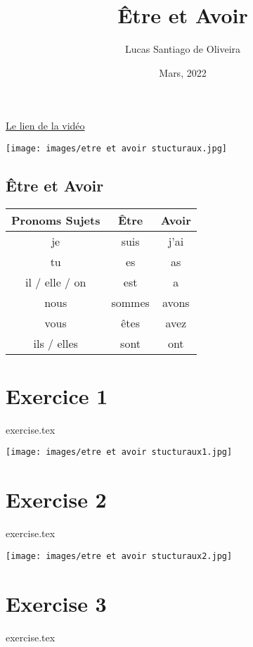\documentclass{article}
\title{Être et Avoir}
\author{Lucas Santiago de Oliveira}
\date{Mars, 2022}
\begin{document}
    \maketitle

    \vspace{2cm}

    \href{https://www.youtube.com/watch?v=Z2hZIJFg9v4}{Le lien de la vidéo}
    
    \texttt{[image: images/etre et avoir stucturaux.jpg]}
    \newpage

    \begin{center}
        \section*{Être et Avoir}
        \begin{tabular}{|c|c|c|}
            \hline
            Pronoms Sujets & Être & Avoir \\
            \hline
            je & suis & j'ai \\
            \hline
            tu & es & as \\ 
            \hline
            il / elle / on & est & a \\
            \hline
            nous & sommes & avons \\
            \hline
            vous & êtes & avez \\
            \hline
            ils / elles & sont & ont \\
            \hline
        \end{tabular}
    \end{center}

    \section*{Exercice 1}
    {exercise.tex}

    \newpage
    \texttt{[image: images/etre et avoir stucturaux1.jpg]}

    \section*{Exercise 2}
    {exercise.tex}

    \newpage
    \texttt{[image: images/etre et avoir stucturaux2.jpg]}

    \section*{Exercise 3}
    {exercise.tex}
\end{document}
